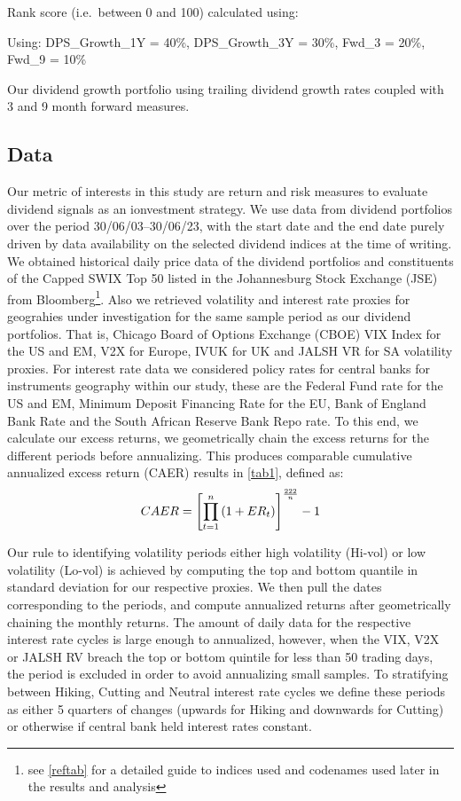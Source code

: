 \documentclass[11pt,preprint, authoryear]{elsarticle}
\numberwithin{equation}{section}
\numberwithin{figure}{section}
\numberwithin{table}{section}
\let\rmarkdownfootnote\footnote%
\def\footnote{\protect\rmarkdownfootnote}
\begin{document}
Rank score (i.e.~between 0 and 100) calculated using:

Using: DPS\_Growth\_1Y = 40\%, DPS\_Growth\_3Y = 30\%, Fwd\_3 = 20\%,
Fwd\_9 = 10\%

Our dividend growth portfolio using trailing dividend growth rates
coupled with 3 and 9 month forward measures.

\hypertarget{data}{%
\subsection*{Data}\label{data}}

Our metric of interests in this study are return and risk measures to
evaluate dividend signals as an ionvestment strategy. We use data from
dividend portfolios over the period 30/06/03--30/06/23, with the start
date and the end date purely driven by data availability on the selected
dividend indices at the time of writing. We obtained historical daily
price data of the dividend portfolios and constituents of the Capped
SWIX Top 50 listed in the Johannesburg Stock Exchange (JSE) from
Bloomberg\footnote{see \ref{reftab} for a detailed guide to indices used
  and codenames used later in the results and analysis}. Also we
retrieved volatility and interest rate proxies for geograhies under
investigation for the same sample period as our dividend portfolios.
That is, Chicago Board of Options Exchange (CBOE) VIX Index for the US
and EM, V2X for Europe, IVUK for UK and JALSH VR for SA volatility
proxies. For interest rate data we considered policy rates for central
banks for instruments geography within our study, these are the Federal
Fund rate for the US and EM, Minimum Deposit Financing Rate for the EU,
Bank of England Bank Rate and the South African Reserve Bank Repo rate.
To this end, we calculate our excess returns, we geometrically chain the
excess returns for the different periods before annualizing. This
produces comparable cumulative annualized excess return (CAER) results
in \ref{tab1}, defined as: \begin{align}
C A E R=\left[\prod_{t=1}^n\left(1+E R_t\right)\right]^{\frac{222}{n}}-1 \notag
\end{align}

Our rule to identifying volatility periods either high volatility
(Hi-vol) or low volatility (Lo-vol) is achieved by computing the top and
bottom quantile in standard deviation for our respective proxies. We
then pull the dates corresponding to the periods, and compute annualized
returns after geometrically chaining the monthly returns. The amount of
daily data for the respective interest rate cycles is large enough to
annualized, however, when the VIX, V2X or JALSH RV breach the top or
bottom quintile for less than 50 trading days, the period is excluded in
order to avoid annualizing small samples. To stratifying between Hiking,
Cutting and Neutral interest rate cycles we define these periods as
either 5 quarters of changes (upwards for Hiking and downwards for
Cutting) or otherwise if central bank held interest rates constant.
\end{document}
